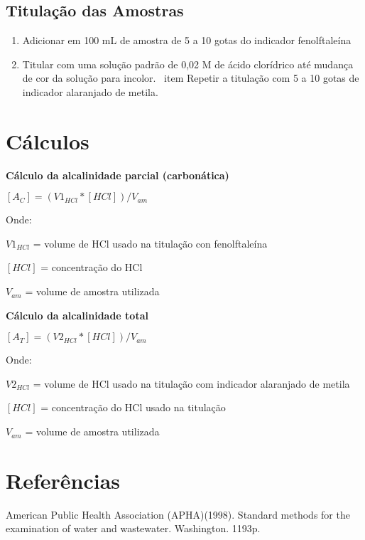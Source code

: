 \documentclass[a4paper,10pt]{SelfArx}
\begin{document}
\subsection{Titulação das Amostras}
\begin{enumerate}[noitemsep]
\item Adicionar em 100 mL de amostra de 5 a 10 gotas do indicador fenolftaleína 
\item Titular com uma solução padrão de 0,02 M de ácido clorídrico até mudança de cor da solução para incolor.
\ item Repetir a titulação com 5 a 10 gotas de indicador alaranjado de metila.
\end{enumerate}

\section{Cálculos}

\indent 
\textbf {Cálculo da alcalinidade parcial (carbonática)}

\begin{center}
$[A_{C}] = (V1_{HCl} * [HCl])/V_{am}$
\end{center}

Onde:

$V1_{HCl}$ = volume de HCl usado na titulação con fenolftaleína

$[HCl]$ = concentração do HCl

$V_{am}$ = volume de amostra utilizada


\vspace{0.15cm}
\noindent 
\textbf {Cálculo da alcalinidade total}

\begin{center}
$[A_{T}] = (V2_{HCl} * [HCl])/V_{am}$
\end{center}

Onde:

$V2_{HCl}$ = volume de HCl usado na titulação com indicador alaranjado de metila

$[HCl]$ = concentração do HCl usado na titulação

$V_{am}$ = volume de amostra utilizada




 
\section{Referências}
American Public Health Association (APHA)(1998). Standard methods for the examination of water and wastewater. Washington. 1193p.


% 
\end{document}

